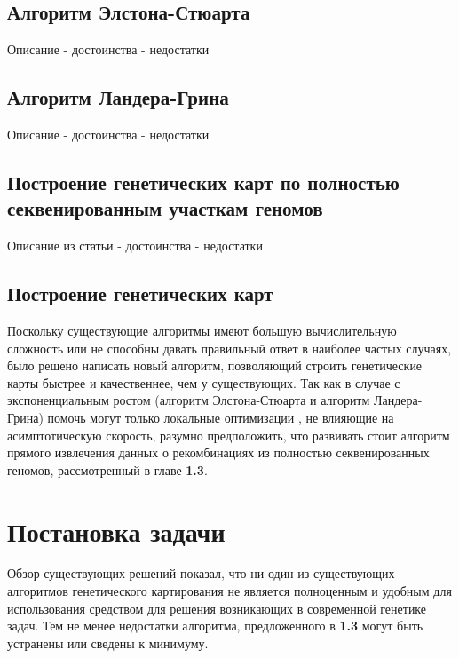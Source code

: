 \documentclass{matmex-diploma-custom}
\begin{document}
\subsection{Алгоритм Элстона-Стюарта}

\cite{elston1971general}

Описание - достоинства - недостатки

\subsection{Алгоритм Ландера-Грина}

\cite{lander1987construction, lander}

Описание - достоинства - недостатки

\subsection{Построение генетических карт по полностью секвенированным
участкам геномов}

Описание из статьи - достоинства - недостатки

\subsection*{Построение генетических карт}

Поскольку существующие алгоритмы имеют большую вычислительную
сложность или не способны давать правильный ответ в наиболее частых случаях,
было решено написать новый алгоритм, позволяющий строить генетические
карты быстрее и качественнее, чем у существующих. Так как в случае с
экспоненциальным ростом (алгоритм Элстона-Стюарта и алгоритм
Ландера-Грина) помочь могут только локальные оптимизации
\cite{o2001rapid, fishelson2002exact, fishelson2004optimizing}, не влияющие на
асимптотическую скорость, разумно предположить, что развивать стоит
алгоритм прямого извлечения данных о рекомбинациях из полностью
секвенированных геномов, рассмотренный в главе \textbf{1.3}.

\section{Постановка задачи}

Обзор существующих решений показал, что ни один из существующих
алгоритмов генетического картирования не является полноценным и
удобным для использования средством для решения возникающих в
современной генетике задач. Тем не менее недостатки алгоритма,
предложенного в \textbf{1.3} могут быть устранены или сведены к минимуму.
\end{document}
